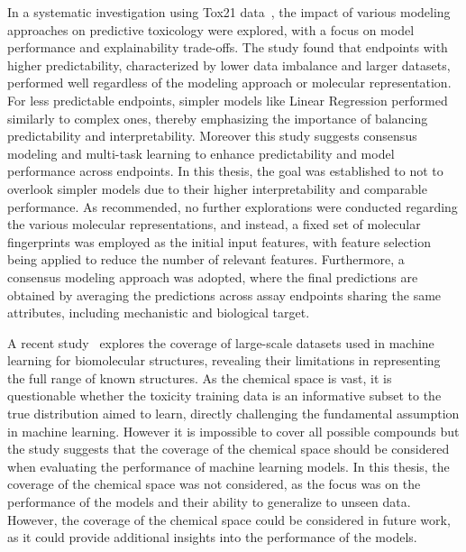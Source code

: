 In a systematic investigation using Tox21 data~\cite{wu2021}, the impact of various modeling approaches on predictive toxicology were explored, with a focus on model performance and explainability trade-offs. The study found that endpoints with higher predictability, characterized by lower data imbalance and larger datasets, performed well regardless of the modeling approach or molecular representation. For less predictable endpoints, simpler models like Linear Regression performed similarly to complex ones, thereby emphasizing the importance of balancing predictability and interpretability. Moreover this study suggests consensus modeling and multi-task learning to enhance predictability and model performance across endpoints. In this thesis, the goal was established to not to overlook simpler models due to their higher interpretability and comparable performance. As recommended, no further explorations were conducted regarding the various molecular representations, and instead, a fixed set of molecular fingerprints was employed as the initial input features, with feature selection being applied to reduce the number of relevant features. Furthermore, a consensus modeling approach was adopted, where the final predictions are obtained by averaging the predictions across assay endpoints sharing the same attributes, including mechanistic and biological target.


A recent study~\cite{kretschmer2023} explores the coverage of large-scale datasets used in machine learning for biomolecular structures, revealing their limitations in representing the full range of known structures. As the chemical space is vast, it is questionable whether the toxicity training data is an informative subset to the true distribution aimed to learn, directly challenging the fundamental assumption in machine learning. However it is impossible to cover all possible compounds but the study suggests that the coverage of the chemical space should be considered when evaluating the performance of machine learning models. In this thesis, the coverage of the chemical space was not considered, as the focus was on the performance of the models and their ability to generalize to unseen data. However, the coverage of the chemical space could be considered in future work, as it could provide additional insights into the performance of the models.


